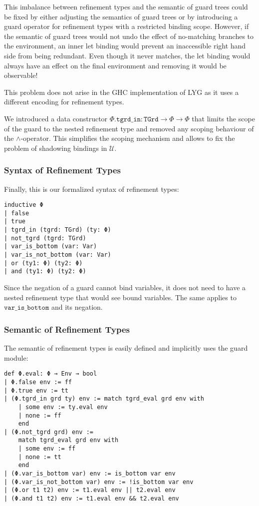 This imbalance between refinement types and the semantic of guard trees could be fixed by either adjusting the semantics of guard trees or by
introducing a guard operator for refinement types with a restricted binding scope.
However, if the semantic of guard trees would not undo the effect of no-matching branches to the environment,
an inner let binding would prevent an inaccessible right hand side from being redundant. Even though it never matches, the let binding would always have an effect
on the final environment and removing it would be observable!

This problem does not arise in the GHC implementation of LYG as it uses a different encoding for refinement types.

We introduced a data constructor $\mathtt{Φ.tgrd\_in}: \mathtt{TGrd} \to Φ \to Φ$ that limits the scope of the guard to the nested refinement type and removed any scoping behaviour of the $\land$-operator.
This simplifies the scoping mechanism and allows to fix the problem of shadowing bindings in $\mathcal{U}$.

\subsubsection{Syntax of Refinement Types}

Finally, this is our formalized syntax of refinement types:

\begin{verbatim}
inductive Φ
| false
| true
| tgrd_in (tgrd: TGrd) (ty: Φ)
| not_tgrd (tgrd: TGrd)
| var_is_bottom (var: Var)
| var_is_not_bottom (var: Var)
| or (ty1: Φ) (ty2: Φ)
| and (ty1: Φ) (ty2: Φ)
\end{verbatim}

Since the negation of a guard cannot bind variables,
it does not need to have a nested refinement type that would see bound variables.
The same applies to $\mathtt{var\_is\_bottom}$ and its negation.

\subsubsection{Semantic of Refinement Types}

The semantic of refinement types is easily defined and implicitly uses the guard module:

\begin{verbatim}
def Φ.eval: Φ → Env → bool
| Φ.false env := ff
| Φ.true env := tt
| (Φ.tgrd_in grd ty) env := match tgrd_eval grd env with
    | some env := ty.eval env
    | none := ff
    end
| (Φ.not_tgrd grd) env :=
    match tgrd_eval grd env with
    | some env := ff
    | none := tt
    end
| (Φ.var_is_bottom var) env := is_bottom var env
| (Φ.var_is_not_bottom var) env := !is_bottom var env
| (Φ.or t1 t2) env := t1.eval env || t2.eval env
| (Φ.and t1 t2) env := t1.eval env && t2.eval env
\end{verbatim}

